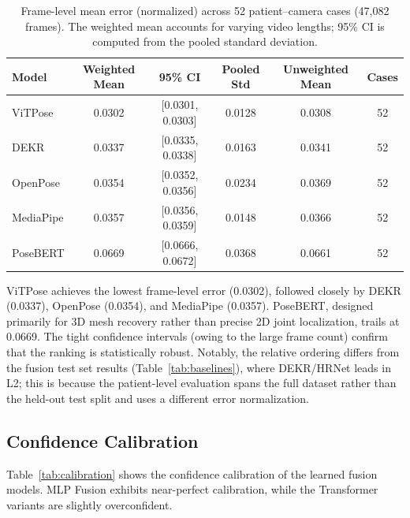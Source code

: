 \documentclass[11pt,a4paper]{article}
\begin{document}
\begin{table}[H]
\centering
\caption{Frame-level mean error (normalized) across 52 patient--camera cases
         (47{,}082 frames).  The weighted mean accounts for varying video
         lengths; 95\% CI is computed from the pooled standard deviation.}
\label{tab:patient}
\begin{tabular}{@{}lccccc@{}}
\toprule
\textbf{Model} & \textbf{Weighted Mean} & \textbf{95\% CI} & \textbf{Pooled Std} & \textbf{Unweighted Mean} & \textbf{Cases} \\
\midrule
ViTPose    & 0.0302 & [0.0301, 0.0303] & 0.0128 & 0.0308 & 52 \\
DEKR       & 0.0337 & [0.0335, 0.0338] & 0.0163 & 0.0341 & 52 \\
OpenPose   & 0.0354 & [0.0352, 0.0356] & 0.0234 & 0.0369 & 52 \\
MediaPipe  & 0.0357 & [0.0356, 0.0359] & 0.0148 & 0.0366 & 52 \\
PoseBERT   & 0.0669 & [0.0666, 0.0672] & 0.0368 & 0.0661 & 52 \\
\bottomrule
\end{tabular}
\end{table}

ViTPose achieves the lowest frame-level error (0.0302), followed closely by
DEKR (0.0337), OpenPose (0.0354), and MediaPipe (0.0357).  PoseBERT, designed
primarily for 3D mesh recovery rather than precise 2D joint localization,
trails at 0.0669.  The tight confidence intervals (owing to the large frame
count) confirm that the ranking is statistically robust.  Notably, the relative
ordering differs from the fusion test set results (Table~\ref{tab:baselines}),
where DEKR/HRNet leads in L2; this is because the patient-level evaluation
spans the full dataset rather than the held-out test split and uses a different
error normalization.

\subsection{Confidence Calibration}

Table~\ref{tab:calibration} shows the confidence calibration of the learned fusion
models.  MLP Fusion exhibits near-perfect calibration, while the Transformer
variants are slightly overconfident.
\end{document}
